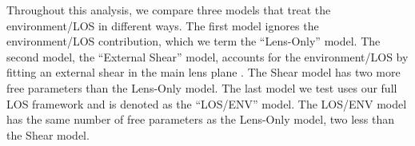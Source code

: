 Throughout this analysis, we compare three models that treat the environment/LOS in different ways. The first model ignores the environment/LOS contribution, which we term the ``Lens-Only'' model. The second model, the ``External Shear'' model, accounts for the environment/LOS by fitting an external shear in the main lens plane \citep[e.g.,][]{Suyu13}. The Shear model has two more free parameters than the Lens-Only model. The last model we test uses our full LOS framework and is denoted as the ``LOS/ENV'' model. The LOS/ENV model has the same number of free parameters as the Lens-Only model, two less than the Shear model.
  